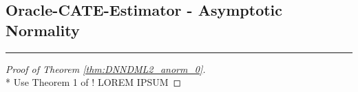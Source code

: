 \subsection{Oracle-CATE-Estimator - Asymptotic Normality}
\hrule

\begin{proof}[Proof of Theorem \ref{thm:DNNDML2_anorm_0}]\mbox{}\\*
    {\color{red} Use Theorem 1 of \citet{peng_rates_2022}!}
    {\color{red} LOREM IPSUM}
\end{proof}